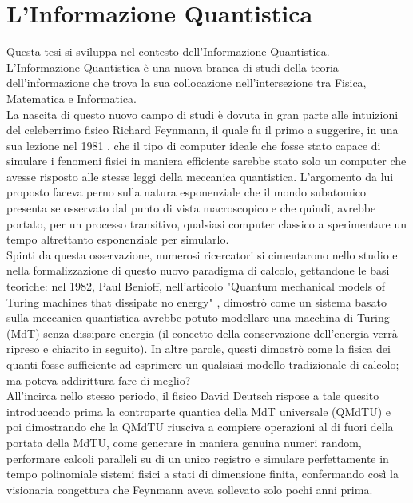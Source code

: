 \documentclass[12pt,a4paper,openright]{report}
\begin{document}
\chapter{L'Informazione Quantistica}
Questa tesi si sviluppa nel contesto dell'Informazione Quantistica.\\
L'Informazione Quantistica è una nuova branca di studi della teoria dell'informazione che trova la sua collocazione nell'intersezione tra
Fisica, Matematica e Informatica.\\
La nascita di questo nuovo campo di studi è dovuta in gran parte alle intuizioni del celeberrimo fisico Richard Feynmann, il quale fu il primo a suggerire,
in una sua lezione nel 1981 \cite{ref6}, che il tipo di computer ideale che fosse stato capace di simulare i fenomeni fisici in maniera
efficiente sarebbe stato solo un computer che avesse risposto alle stesse leggi della meccanica quantistica. L'argomento da lui proposto faceva
perno sulla natura esponenziale che il mondo subatomico presenta se osservato dal punto di vista macroscopico e che quindi, avrebbe portato,
per un processo transitivo, qualsiasi computer classico a sperimentare un tempo altrettanto esponenziale per simularlo.\\
Spinti da questa osservazione, numerosi ricercatori si cimentarono nello studio e nella formalizzazione di questo nuovo paradigma di calcolo,
gettandone le basi teoriche: nel 1982, Paul Benioff, nell'articolo "Quantum mechanical models of Turing machines that dissipate no energy" \cite{ref7}, 
dimostrò come un sistema basato sulla meccanica quantistica avrebbe potuto modellare una macchina di Turing (MdT) senza dissipare energia (il concetto della conservazione dell'energia 
verrà ripreso e chiarito in seguito). In altre parole, questi dimostrò come la fisica dei quanti fosse sufficiente ad esprimere un qualsiasi modello tradizionale di calcolo; ma poteva addirittura fare di meglio? \\
All'incirca nello stesso periodo, il fisico David Deutsch rispose a tale quesito \cite{ref12} introducendo prima la controparte quantica della MdT universale (QMdTU)
e poi dimostrando che la QMdTU riusciva a compiere operazioni al di fuori della portata della MdTU, come generare in maniera genuina numeri random,
performare calcoli paralleli su di un unico registro e simulare perfettamente in tempo polinomiale sistemi fisici a stati di dimensione finita, confermando così
la visionaria congettura che Feynmann aveva sollevato solo pochi anni prima.  
\end{document}
